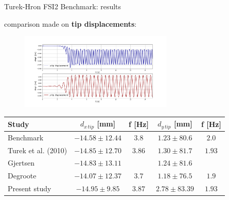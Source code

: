 \documentclass[10pt,t]{beamer}
\begin{document}
\begin{frame}{Turek-Hron FSI2 Benchmark: results}

comparison made on \textbf{tip displacements}:
\begin{figure}[htbp!]
	\centering
	\includegraphics[width=0.65\textwidth, trim=20 20 20 50, clip]{images/FSI2/disp_fsi2.png}
\end{figure}


\footnotesize
\begin{center}
\begin{tabular}{ l | c c | c c  |  } 
	Study & $d_{x\,tip}$ [\si{mm}] & f [\si{Hz}] & $d_{y\,tip}$ [\si{mm}] & f [\si{Hz}] \\ 
	\hline
	\hline
	Benchmark & $-14.58\pm12.44$ & $3.8$ & $1.23\pm80.6$ & $2.0$ \\
	Turek et al. (2010) & $-14.85\pm12.70$ & $3.86$ & $1.30\pm81.7$ & $1.93$ \\
	Gjertsen & $-14.83\pm13.11$ & & $1.24\pm81.6$ & \\
	Degroote & $-14.07\pm12.37$ & $3.7$ & $1.18\pm76.5$ & $1.9$ \\
	\hline
	Present study & $-14.95\pm9.85$ & $3.87$ & $2.78\pm83.39$ & $1.93$ \\ 
\end{tabular}
    
\end{center}

\end{frame}
\end{document}
